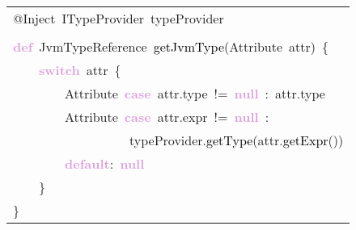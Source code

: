 \begin{tabular}[t]{l}
\noindent
\mbox{}@Inject\ ITypeProvider\ typeProvider \\
\mbox{} \\
\mbox{}\textbf{\textcolor{Plum}{def}}\ JvmTypeReference\ \textcolor{Black}{getJvmType}(Attribute\ attr)\ \{ \\
\mbox{}\ \ \ \ \textbf{\textcolor{Plum}{switch}}\ attr\ \{ \\
\mbox{}\ \ \ \ \ \ \ \ Attribute\ \textbf{\textcolor{Plum}{case}}\ attr.type\ !=\ \textbf{\textcolor{Plum}{null}}\ :\ attr.type \\
\mbox{}\ \ \ \ \ \ \ \ Attribute\ \textbf{\textcolor{Plum}{case}}\ attr.expr\ !=\ \textbf{\textcolor{Plum}{null}}\ :\  \\
\mbox{}\ \ \ \ \ \ \ \ \ \ \ \ \ \ \ \ \ \ typeProvider.\textcolor{Black}{getType}(attr.\textcolor{Black}{getExpr}()) \\
\mbox{}\ \ \ \ \ \ \ \ \textbf{\textcolor{Plum}{default}}:\ \textbf{\textcolor{Plum}{null}} \\
\mbox{}\ \ \ \ \} \\
\mbox{}\}
\end{tabular}

